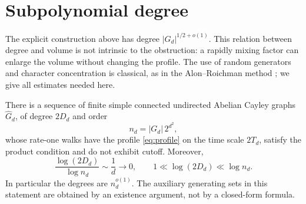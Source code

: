 \documentclass[11pt]{article}
\theoremstyle{remark}\newtheorem{remark}[theorem]{Remark}
\begin{document}
\section{Subpolynomial degree}
The explicit construction above has degree $|G_d|^{1/2+o(1)}$. This relation between degree and volume is not intrinsic to the obstruction: a rapidly mixing factor can enlarge the volume without changing the profile. The use of random generators and character concentration is classical, as in the Alon--Roichman method \cite{AR}; we give all estimates needed here.

\begin{corollary}\label{cor:padding}
There is a sequence of finite simple connected undirected Abelian Cayley graphs $\widehat G_d$, of degree $2D_d$ and order
\[
 n_d=|G_d|\,2^{d^2},
\]
whose rate-one walks have the profile \eqref{eq:profile} on the time scale $2T_d$, satisfy the product condition and do not exhibit cutoff. Moreover,
\[
 \frac{\log(2D_d)}{\log n_d}\sim\frac1d\longrightarrow0,
 \qquad 1\ll\log(2D_d)\ll\log n_d.
\]
In particular the degrees are $n_d^{o(1)}$. The auxiliary generating sets in this statement are obtained by an existence argument, not by a closed-form formula.
\end{corollary}
\end{document}
